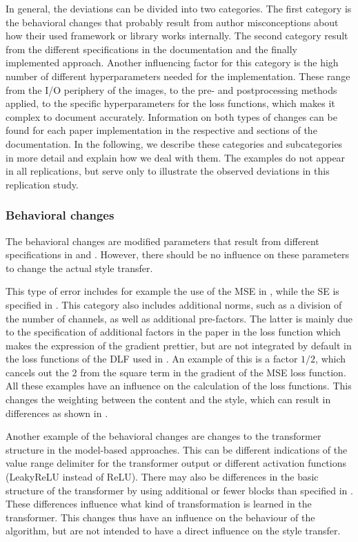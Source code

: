 In general, the deviations can be divided into two categories. The first category is the behavioral changes that probably result from author misconceptions about how their used framework or library works internally. The second category  result from the different specifications in the documentation and the finally implemented approach. Another influencing factor for this category is the high number of different hyperparameters needed for the implementation. These range from the I/O periphery of the images, to the pre- and postprocessing methods applied, to the specific hyperparameters for the loss functions, which makes it complex to document accurately. Information on both types of changes can be found for each paper implementation in the respective  and  sections of the documentation. In the following, we describe these categories and subcategories in more detail and explain how we deal with them. The examples do not appear in all replications, but serve only to illustrate the observed deviations in this replication study.

\subsubsection{Behavioral changes}
The behavioral changes are modified parameters that result from different specifications in \paper{} and \implementation{}. However, there should be no influence on these parameters to change the actual style transfer.  

This type of error includes for example the use of the \gls{MSE} in \implementation{}, while the \gls{SE} is specified in \paper{}. This category also includes additional norms, such as a division of the number of channels, as well as additional pre-factors. The latter is mainly due to the specification of additional factors in the paper in the loss function which makes the expression of the gradient prettier, but are not integrated by default in the loss functions of the \gls{DLF} used in \implementation{}. An example of this is a factor $1/2$, which cancels out the $2$ from the square term in the gradient of the \gls{MSE} loss function. All these examples have an influence on the calculation of the loss functions. This changes the weighting between the content and the style, which can result in differences as shown in . 

Another example of the behavioral changes are changes to the transformer structure in the model-based approaches. This can be different indications of the value range delimiter for the transformer output or different activation functions (LeakyReLU instead of ReLU). There may also be differences in the basic structure of the transformer by using additional or fewer blocks than specified in \paper{}. These differences influence what kind of transformation is learned in the transformer. This changes thus have an influence on the behaviour of the algorithm, but are not intended to have a direct influence on the style transfer.

